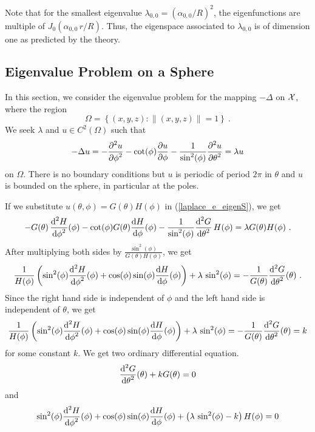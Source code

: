Note that for the smallest eigenvalue $\lambda_{0,0} = (\alpha_{0,0}/R)^2$,
the eigenfunctions are multiple of
$\displaystyle J_0\left(\alpha_{0,0}\,r/R\right)$.  Thus, the
eigenspace associated to $\lambda_{0,0}$ is of dimension one as
predicted by the theory.

\subsection{Eigenvalue Problem on a Sphere}

In this section, we consider the eigenvalue problem for the mapping
$-\Delta$ on $\cal X$, where the region
\[
  \Omega = \left\{ (x,y,z) :  \|(x,y,z)\| = 1 \right\} \ .
\]
We seek $\lambda$ and $u \in C^2(\Omega)$ such that
\begin{equation} \label{laplace_e_eigenS}
-\Delta u = -\frac{\displaystyle \partial^{2}{u}} {\displaystyle \partial \phi^{2}} - \cot(\phi)\frac{\partial{u}}{\partial \phi}
- \frac{1}{\sin^2(\phi)}\frac{\displaystyle \partial^{2}{u}} {\displaystyle \partial \theta^{2}} 
= \lambda u
\end{equation}
on $\Omega$.  There is no boundary conditions but $u$ is periodic of period
$2\pi$ in $\theta$ and $u$ is bounded on the sphere, in particular at
the poles.

If we substitute $u(\theta, \phi) = G(\theta)H(\phi)$ in
(\ref{laplace_e_eigenS}), we get 
\begin{equation} \label{laplace_e_eigenSB}
-G(\theta)\,\frac{\displaystyle \mathrm{d}^{2}{H}} {\displaystyle \mathrm{d}{\phi}^{2}}(\phi) -\cot(\phi) G(\theta)\frac{\mathrm{d}H}{\mathrm{d}{\phi}}(\phi)
- \frac{1}{\sin^2(\phi)} \frac{\displaystyle \mathrm{d}^{2}{G}} {\displaystyle \mathrm{d}{\theta}^{2}}\,H(\phi)
= \lambda G(\theta)H(\phi) \ .
\end{equation}
After multiplying both sides by
$\displaystyle \frac{\sin^2(\phi)}{G(\theta)H(\phi)}$, we get
\[
\frac{1}{H(\phi)} \left(\sin^2(\phi) \frac{\displaystyle \mathrm{d}^{2}{H}} {\displaystyle \mathrm{d}{\phi}^{2}}(\phi)
+ \cos(\phi) \sin(\phi) \frac{\mathrm{d}H}{\mathrm{d}{\phi}}(\phi)\right) +
\lambda\,\sin^2(\phi) = - \frac{1}{G(\theta)} \frac{\displaystyle \mathrm{d}^{2}{G}} {\displaystyle \mathrm{d}{\theta}^{2}}(\theta) \ .
\]
Since the right hand side is independent of $\phi$ and the left hand
side is independent of $\theta$, we get
\[
\frac{1}{H(\phi)} \left(\sin^2(\phi) \frac{\displaystyle \mathrm{d}^{2}{H}} {\displaystyle \mathrm{d}{\phi}^{2}}(\phi)
+ \cos(\phi) \sin(\phi) \frac{\mathrm{d}H}{\mathrm{d}{\phi}}(\phi)\right) +
\lambda\,\sin^2(\phi) = - \frac{1}{G(\theta)} \frac{\displaystyle \mathrm{d}^{2}{G}} {\displaystyle \mathrm{d}{\theta}^{2}}(\theta)
= k
\]
for some constant $k$.  We get two ordinary differential equation.
\begin{equation} \label{laplace_e_eigenS1}
\frac{\displaystyle \mathrm{d}^{2}{G}} {\displaystyle \mathrm{d}{\theta}^{2}}(\theta) + k G(\theta) = 0
\end{equation}
and
\begin{equation} \label{laplace_e_eigenS2}
\sin^2(\phi) \frac{\displaystyle \mathrm{d}^{2}{H}} {\displaystyle \mathrm{d}{\phi}^{2}}(\phi)
+ \cos(\phi) \sin(\phi) \frac{\mathrm{d}H}{\mathrm{d}{\phi}}(\phi) +
\left( \lambda\,\sin^2(\phi) - k\right) H(\phi) = 0
\end{equation}

